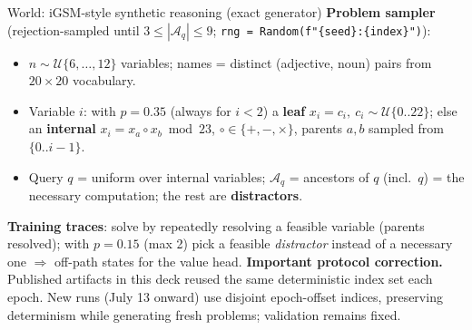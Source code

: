 \documentclass[aspectratio=169,10pt]{beamer}
\begin{document}
\begin{frame}{World: iGSM-style synthetic reasoning (exact generator)}
\textbf{Problem sampler} (rejection-sampled until $3\le|\mathcal A_q|\le 9$; \texttt{rng = Random(f"\{seed\}:\{index\}")}):
\begin{itemize}\itemsep1pt
  \item $n\sim\mathcal U\{6,\dots,12\}$ variables; names = distinct
        (adjective, noun) pairs from $20\times 20$ vocabulary.
  \item Variable $i$: with $p{=}0.35$ (always for $i<2$) a \textbf{leaf}
        $x_i = c_i,\ c_i\sim\mathcal U\{0..22\}$; else an \textbf{internal}
        $x_i = x_a \circ x_b \bmod 23$, $\circ\in\{+,-,\times\}$,
        parents $a,b$ sampled from $\{0..i-1\}$.
  \item Query $q$ = uniform over internal variables;
        $\mathcal A_q$ = ancestors of $q$ (incl.\ $q$) = the necessary
        computation; the rest are \textbf{distractors}.
\end{itemize}
\medskip
\textbf{Training traces}: solve by repeatedly resolving a feasible variable
(parents resolved); with $p{=}0.15$ (max 2) pick a feasible \emph{distractor}
instead of a necessary one $\Rightarrow$ off-path states for the value head.
\textbf{Important protocol correction.} Published artifacts in this deck reused
the same deterministic index set each epoch. New runs (July 13 onward) use
disjoint epoch-offset indices, preserving determinism while generating fresh
problems; validation remains fixed.
\end{frame}
\end{document}

